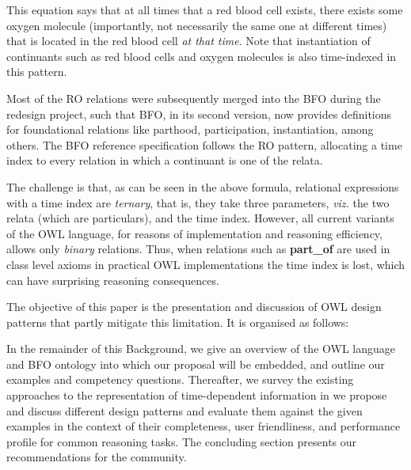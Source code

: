 This equation says that at all times that a red blood cell exists, there exists some oxygen molecule (importantly, not necessarily the same one at different times) that is located in the red blood cell \emph{at that time}. Note that instantiation of continuants such as red blood cells and oxygen molecules is also time-indexed in this pattern. 

Most of the RO relations 
were subsequently merged into the BFO during the redesign project, such that BFO, in its second version, now provides definitions for foundational 
relations like parthood, participation, instantiation, among others. The BFO reference specification follows the RO pattern, 
allocating a time index to every relation in which a continuant is one of the relata. 

The challenge is that, as can be seen in the above formula, relational expressions with a time index are \emph{ternary}, that is, they take three parameters, \emph{viz.} the two relata (which are particulars), and the time index. However, all current variants of the OWL language, for reasons of implementation and reasoning efficiency, allows only \emph{binary} relations. 
Thus, when relations such as \textbf{part\_of} are used in class level axioms
in practical OWL implementations 
the time index is lost, which can have surprising reasoning consequences. 


The objective of this paper is the presentation and discussion of OWL design patterns that partly mitigate this limitation. It is organised as follows:

In the remainder of this Background, we give an overview of the OWL language and BFO ontology into which our proposal will be embedded, and outline our examples and competency questions.
Thereafter, we survey the existing approaches to the representation of time-dependent information in
we propose and discuss different design patterns and evaluate them against the given examples in the context of their completeness, user friendliness, and performance profile for common reasoning tasks.
The concluding section presents our recommendations for the community.

